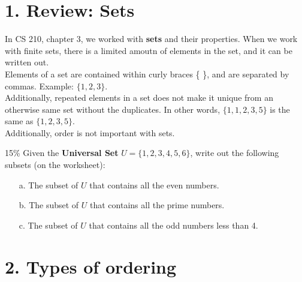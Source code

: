\documentclass[a4paper,12pt]{book}
\begin{document}
    \section*{1. Review: Sets}

        \begin{introNOHEAD}
            In CS 210, chapter 3, we worked with \textbf{sets} and their properties.
            When we work with finite sets, there is a limited amoutn of
            elements in the set, and it can be written out. ~\\

            Elements of a set are contained within curly braces \{ \},
            and are separated by commas. Example: $\{ 1, 2, 3 \}$. ~\\

            Additionally, repeated elements in a set does not make it
            unique from an otherwise same set without the duplicates.
            In other words, $\{1, 1, 2, 3, 5\}$ is the same as $\{1, 2, 3, 5\}$. ~\\

            Additionally, order is not important with sets.
        \end{introNOHEAD}

        \begin{question}{1}{15\%}
            Given the \textbf{ Universal Set } $U = \{ 1, 2, 3, 4, 5, 6 \}$,
            write out the following subsets (on the worksheet):
        \end{question}

        \begin{enumerate}
            \item[a.] The subset of $U$ that contains all the even numbers.

            \item[b.] The subset of $U$ that contains all the prime numbers.

            \item[c.] The subset of $U$ that contains all the odd numbers less than 4.
        \end{enumerate}

    
    \section*{2. Types of ordering}
\end{document}
